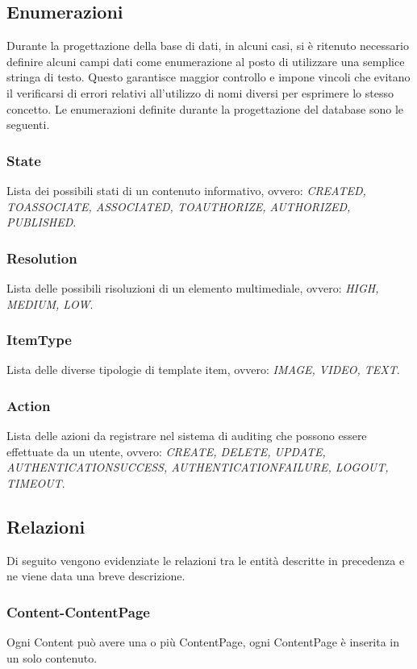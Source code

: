 \subsection{Enumerazioni}
Durante la progettazione della base di dati, in alcuni casi, si è ritenuto necessario definire alcuni campi dati come enumerazione al posto di utilizzare una semplice stringa di testo.
Questo garantisce maggior controllo e impone vincoli che evitano il verificarsi di errori relativi all'utilizzo di nomi diversi per esprimere lo stesso concetto. Le enumerazioni definite durante la progettazione del database sono le seguenti.

\subsubsection{State}
Lista dei possibili stati di un contenuto informativo, ovvero: \textit{CREATED, TO\textunderscore{}ASSOCIATE, ASSOCIATED, TO\textunderscore{}AUTHORIZE, AUTHORIZED, PUBLISHED}.

\subsubsection{Resolution}
Lista delle possibili risoluzioni di un elemento multimediale, ovvero: \textit{HIGH, MEDIUM, LOW}.

\subsubsection{ItemType}
Lista delle diverse tipologie di template item, ovvero: \textit{IMAGE, VIDEO, TEXT}.

\subsubsection{Action}
Lista delle azioni da registrare nel sistema di auditing che possono essere effettuate da un utente, ovvero: \textit{CREATE, DELETE, UPDATE, AUTHENTICATION\textunderscore{}SUCCESS, AUTHENTICATION\textunderscore{}FAILURE, LOGOUT, TIMEOUT}.

\subsection{Relazioni}
\label{rel}
Di seguito vengono evidenziate le relazioni tra le entità descritte in precedenza e ne viene data una breve descrizione.
\subsubsection{Content-ContentPage}
Ogni Content può avere una o più ContentPage, ogni ContentPage è inserita in un solo contenuto.
